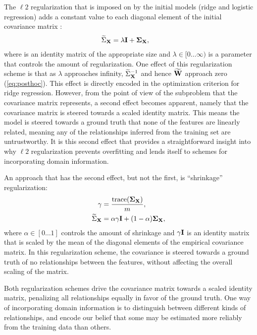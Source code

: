 \documentclass[a4paper]{vanvliet_paper}
\newcommand{\modcov}{\widetilde{\Sigma}_{\mat{X}}}
\newcommand{\modweights}{\widetilde{\mat{W}}}
\newcommand{\tmodweights}{$\modweights$\xspace}
\begin{document}
The $\ell 2$ regularization that is imposed on  by the initial models (ridge and logistic regression) adds a constant value to each diagonal element of the initial covariance matrix :
\begin{align}\label{eq:l2}
    \modcov &= \lambda \mat{I} + \cov{\mat{X}},
\end{align}
where  is an identity matrix of the appropriate size and $\lambda \in [0 \ldots \infty)$ is a parameter that controls the amount of regularization.
One effect of this regularization scheme is that as $\lambda$ approaches infinity, $\modcov^{-1}$ and hence \tmodweights approach zero (\autoref{eq:posthoc}).
This effect is directly encoded in the optimization criterion for ridge regression\cite{Rifkin2007, Hastie2009}.
However, from the point of view of the subproblem that the covariance matrix represents, a second effect becomes apparent, namely that the covariance matrix is steered towards a scaled identity matrix.
This means the model is steered towards a ground truth that none of the features are linearly related, meaning any of the relationships inferred from the training set are untrustworthy.
It is this second effect that provides a straightforward insight into why $\ell 2$ regularization prevents overfitting and lends itself to schemes for incorporating domain information.

An approach that has the second effect, but not the first, is ``shrinkage'' regularization:\cite{Blankertz2011, Engemann2015} 
\begin{align}
    \gamma &= \frac{\text{trace}(\cov{\mat{X}})}{m}, \\
    \modcov &= \alpha \gamma \mat{I} + (1 - \alpha) \cov{\mat{X}},\label{eq:shrinkage}
\end{align}
where $\alpha \in [0 \ldots 1]$ controls the amount of shrinkage and $\gamma \mathbf{I}$ is an identity matrix that is scaled by the mean of the diagonal elements of the empirical covariance matrix.
In this regularization scheme, the covariance is steered towards a ground truth of no relationships between the features, without affecting the overall scaling of the matrix.

Both regularization schemes drive the covariance matrix towards a scaled identity matrix, penalizing all relationships equally in favor of the ground truth.
One way of incorporating domain information is to distinguish between different kinds of relationships, and encode our belief that some may be estimated more reliably from the training data than others.
\end{document}
